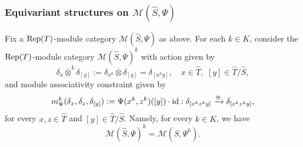 \documentclass{amsart}
\theoremstyle{definition}
\newcommand{\id}{{\rm id}}
\newcommand{\Rep}{{\rm Rep}}
\newcommand{\M}{\mathscr{M}}
\newcommand{\ot}{\otimes}
\numberwithin{equation}{section}
\begin{document}
\subsubsection{Equivariant structures on $\M(\widehat{S},\Psi)$}\label{sec:Equivariant structures on M}
Fix a $\Rep(T)$-module category $\M(\widehat{S},\Psi)$ as above. For each $k\in K$, consider the $\Rep(T)$-module category $\M(\widehat{S},\Psi)^k$ with action given by
$$\delta_{x}\overline{\ot}^k\delta_{[y]}:=\delta_{x^k}\overline{\ot}\delta_{[y]}=\delta_{[x^ky]},\quad x\in \widehat{T},\,\,[y]\in \widehat{T}/\widehat{S},$$
and module associativity constraint given by
\begin{equation*}
m_{\Psi}^k(\delta_x,\delta_z,\delta_{[y]}):=\Psi(x^k,z^k)([y])\cdot \id
:\delta_{[x^kz^ky]}\xrightarrow{\cong}\delta_{[x^kz^ky]},
\end{equation*}
for every $x,z\in \widehat{T}$ and $[y]\in \widehat{T}/\widehat{S}$. 
Namely, for every $k\in K$, we have
$$\M(\widehat{S},\Psi)^k=\M(\widehat{S},\Psi^k).$$
\end{document}
